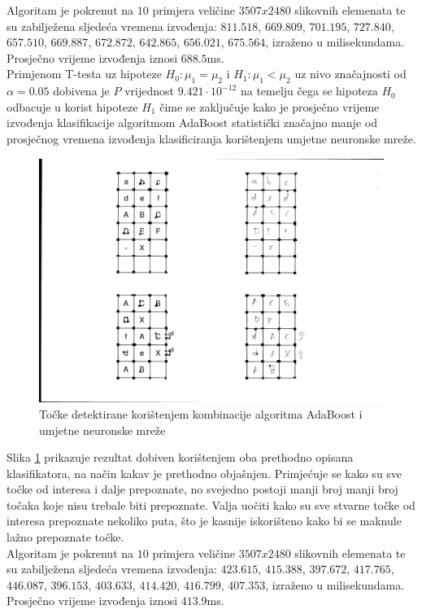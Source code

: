 \documentclass[times, utf8, zavrsni, numeric]{fer}
\begin{document}
Algoritam je pokrenut na $10$ primjera veličine $3507x2480$ slikovnih elemenata te su zabilježena sljedeća vremena izvođenja: $811.518$, $669.809$, $701.195$, $727.840$, $657.510$, $669.887$, $672.872$, $642.865$, $656.021$, $675.564$, izraženo u milisekundama. 
Prosječno vrijeme izvođenja iznosi $688.5$ms.\\

Primjenom T-testa uz hipoteze $H_0: \mu_1 = \mu_2$ i $H_1: \mu_1 < \mu_2$ uz nivo značajnosti od $\alpha = 0.05$ dobivena je $P$ vrijednost $9.421\cdot10^{-12}$ na temelju čega se hipoteza $H_0$ odbacuje u korist hipoteze $H_1$ čime se zaključuje kako je prosječno vrijeme izvođenja klasifikacije algoritmom AdaBoost statistički značajno manje od prosječnog vremena izvođenja klasificiranja korištenjem umjetne neuronske mreže.

\begin{figure}[!ht]
    \centering
    \includegraphics[width=.75\linewidth]{Images/combined.png}
    \captionsetup{justification=centering}
    \caption{Točke detektirane korištenjem kombinacije algoritma AdaBoost i umjetne neuronske mreže}
    \label{fig:combinedResult}
\end{figure}

Slika \ref{fig:combinedResult} prikazuje rezultat dobiven korištenjem oba prethodno opisana klasifikatora, na način kakav je prethodno objašnjen.
Primjećuje se kako su sve točke od interesa i dalje prepoznate, no svejedno postoji manji broj manji broj točaka koje nisu trebale biti prepoznate.
Valja uočiti kako su sve stvarne točke od interesa prepoznate nekoliko puta, što je kasnije iskorišteno kako bi se maknule lažno prepoznate točke.\\

Algoritam je pokrenut na $10$ primjera veličine $3507x2480$ slikovnih elemenata te su zabilježena sljedeća vremena izvođenja: $423.615$, $415.388$, $397.672$, $417.765$, $446.087$, $396.153$, $403.633$, $414.420$, $416.799$, $407.353$, izraženo u milisekundama. 
Prosječno vrijeme izvođenja iznosi $413.9$ms.\\
\end{document}
